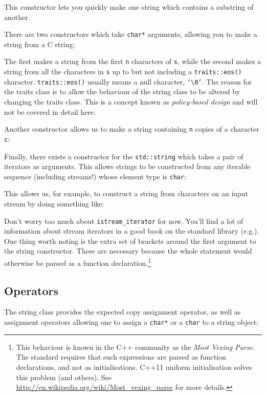 \documentclass[a4paper]{scrartcl}
\begin{document}
This constructor lets you quickly make one string which contains a substring of another.

There are two constructors which take \texttt{char*} arguments, allowing you to make a string from a C string:


The first makes a string from the first \texttt{n} characters of \texttt{s}, while the second makes a string from all the characters in \texttt{s} up to but not including a \texttt{traits::eos()} character. \texttt{traits::eos()} usually means a null character, \texttt{`\textbackslash 0'}. The reason for the traits class is to allow the behaviour of the string class to be altered by changing the traits class. This is a concept known as \emph{policy-based design} and will not be covered in detail here.

Another constructor allows us to make a string containing \texttt{n} copies of a character \texttt{c}:


Finally, there exists a constructor for the \texttt{std::string} which takes a pair of iterators as arguments. This allows strings to be constructed from any iterable sequence (including streams!) whose element type is \texttt{char}:


This allows us, for example, to construct a string from characters on an input stream by doing something like:


Don't worry too much about \texttt{istream\_iterator} for now. You'll find a lot of information about stream iterators in a good book on the standard library (e.g.\cite{StandardLibrary}). One thing worth noting is the extra set of brackets around the first argument to the string constructor. These are necessary because the whole statement would otherwise be parsed as a function declaration.\footnote{This behaviour is known in the C++ community as the \emph{Most Vexing Parse}. The standard requires that such expressions are parsed as function declarations, and not as initialisations. C++11 uniform initialisation solves this problem (and others). See \url{http://en.wikipedia.org/wiki/Most_vexing_parse} for more details.}
\subsection{Operators}
The string class provides the expected copy assignment operator, as well as assignment operators allowing one to assign a \texttt{char*} or a \texttt{char} to a string object:

\end{document}

